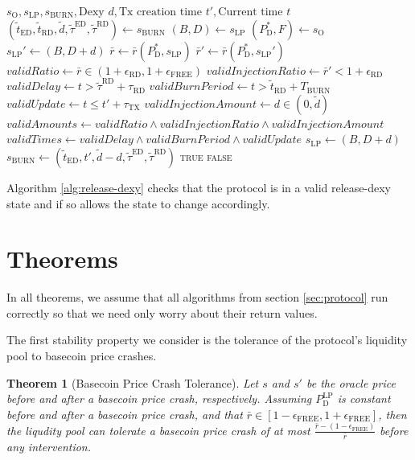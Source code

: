 \documentclass{ifcolog}
\newcommand{\Pdt}{P_{\mathrm{D}}^{*}}
\newcommand{\Plp}{P_{\mathrm{D}}^{\mathrm{LP}}}
\newcommand{\rr}{\bar{r}}
\newcommand{\slp}{s_{\mathrm{LP}}}
\newcommand{\soracle}{s_{\textrm{O}}}
\newcommand{\sburn}{s_{\textrm{BURN}}}
\newcommand{\tautx}{\tau_{\textrm{TX}}}
\newcommand{\epsilonfree}{\epsilon_{\textrm{FREE}}}
\newcommand{\epsilonreleasedexy}{\epsilon_{\textrm{RD}}}
\newtheorem{theorem}{Theorem}
\begin{document}
\begin{algorithm}[H]
\caption{ReleaseDexy}\label{alg:release-dexy}
\begin{algorithmic}[1]
  \Require $\soracle, \slp, \sburn, \textrm{Dexy } d, \textrm{Tx creation time } t', \textrm{Current time } t$
  \State $(\tilde{t}_{\textrm{ED}}, \tilde{t}_{\textrm{RD}}, \tilde{d}, \tilde{\tau}^{\textrm{ED}}, \tilde{\tau}^{\textrm{RD}}) \gets \sburn$
  \State $(B, D) \gets \slp$
  \State $(\Pdt, F) \gets \soracle$
  \State $\slp' \gets (B, D + d)$ 
  \State $\rr \gets \rr(\Pdt, \slp) $
  \State $\rr' \gets \rr(\Pdt, \slp')$
  \State $validRatio \gets \rr \in \left(1 + \epsilonreleasedexy , 1 + \epsilonfree\right)$
  \State $validInjectionRatio \gets \rr' <  1 + \epsilonreleasedexy$
  \State $validDelay \gets t > \tilde{\tau}^{\textrm{RD}} + \tau_{\textrm{RD}}$
  \State $validBurnPeriod \gets t > \tilde{t}_{\textrm{RD}} + T_{\textrm{BURN}}$
  \State $validUpdate \gets t \le t' + \tautx$
  \State $validInjectionAmount \gets d \in (0, \tilde{d})$
  \State $validAmounts \gets validRatio \land validInjectionRatio \land validInjectionAmount$
  \State $validTimes \gets validDelay \land validBurnPeriod \land validUpdate$
    \State $\slp \gets (B, D+d)$
    \State $\sburn \gets (\tilde{t}_{\textrm{ED}}, t', \tilde{d}-d, \tilde{\tau}^{\textrm{ED}}, \tilde{\tau}^{\textrm{RD}})$
    \State \Return \textsc{true}
  \Else
    \State \Return \textsc{false}
  \EndIf
\end{algorithmic}
\end{algorithm}

Algorithm \ref{alg:release-dexy} checks that the protocol is in a valid release-dexy state and if so allows the state to change accordingly.

\newpage

\section{Theorems}
\label{sec:theorems}

In all theorems, we assume that all algorithms from section \ref{sec:protocol} run correctly so that we need only worry about their 
return values.

The first stability property we consider is the tolerance of the protocol's liquidity pool
to basecoin price crashes.

\begin{theorem}[Basecoin Price Crash Tolerance]
  Let $s$ and $s'$ be the oracle price before and after a basecoin price crash, respectively. 
  Assuming $\Plp$ is constant before and after a basecoin price crash, and 
  that $\rr \in \left[1-\epsilonfree, 1+\epsilonfree \right]$, then the liqudity pool can 
  tolerate a basecoin price crash of at most  $\frac{\rr - (1-\epsilonfree)}{\rr}$ 
  before any intervention.
\end{theorem}
\end{document}
